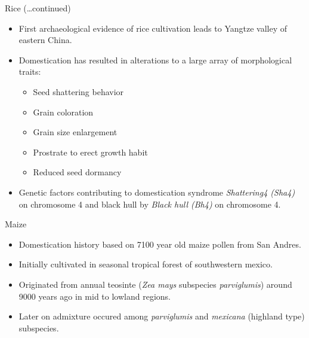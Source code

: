 \documentclass[ignorenonframetext,aspectratio=169]{beamer}
\providecommand{\tightlist}{%
  \setlength{\itemsep}{0pt}\setlength{\parskip}{0pt}}
\begin{document}
\begin{frame}{Rice (\ldots{}continued)}
\protect\hypertarget{rice-continued-1}{}

\begin{itemize}
\tightlist
\item
  First archaeological evidence of rice cultivation leads to Yangtze
  valley of eastern China.
\item
  Domestication has resulted in alterations to a large array of
  morphological traits:

  \begin{itemize}
  \tightlist
  \item
    Seed shattering behavior
  \item
    Grain coloration
  \item
    Grain size enlargement
  \item
    Prostrate to erect growth habit
  \item
    Reduced seed dormancy
  \end{itemize}
\item
  Genetic factors contributing to domestication syndrome
  \emph{Shattering4 (Sha4)} on chromosome 4 and black hull by
  \emph{Black hull (Bh4)} on chromosome 4.
\end{itemize}

\end{frame}

\begin{frame}{Maize}
\protect\hypertarget{maize}{}

\begin{itemize}
\tightlist
\item
  Domestication history based on 7100 year old maize pollen from San
  Andres.
\item
  Initially cultivated in seasonal tropical forest of southwestern
  mexico.
\item
  Originated from annual teosinte (\emph{Zea mays} subspecies
  \emph{parviglumis}) around 9000 years ago in mid to lowland regions.
\item
  Later on admixture occured among \emph{parviglumis} and
  \emph{mexicana} (highland type) subspecies.
\end{itemize}

\end{frame}
\end{document}
